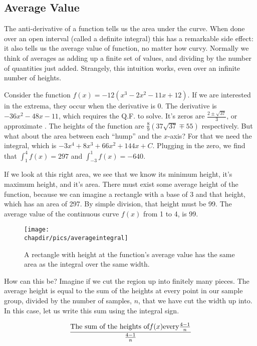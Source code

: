 \subsection{Average Value}
The anti-derivative of a function tells us the area under the curve.  When done over an open
interval (called a definite integral) this has a remarkable side effect: it also tells us the average
value of function, no matter how curvy.  Normally we think of averages as adding up a finite set 
of values, and dividing by the number of quantities just added.  Strangely, this intuition works,
even over an infinite number of heights.

Consider the function $f(x)=-12(x^3-2x^2-11x+12)$.  If we are interested in the extrema, they 
occur when the derivative is 0.  The derivative is $-36x^2-48x-11$, which requires the Q.F. to
solve.  It's zeros are $\frac{2\pm\sqrt{37}}{3}$, or approximate .  The heights of the function
are $\frac{8}{9}(37\sqrt{37}\mp55)$ respectively.  But what about the area between each 
``hump'' and the $x$-axis?  For that we need the integral, which is $-3x^4+8x^3+66x^2+144x+C$.
Plugging in the zero, we find that $\int_1^4 f(x) = 297$ and $\int_{-3}^1 f(x) = -640$.

If we look at this right area, we see that we know its minimum height, it's maximum height, and
it's area.  There must exist some average height of the function, because we can imagine a rectangle
with a base of 3 and that height, which has an area of 297.  By simple division, that height must be
99.  The average value of the continuous curve $f(x)$ from 1 to 4, is 99.


\begin{figure}[h]
\begin{centering}
\texttt{[image: \\chapdir/pics/averageintegral]}
\caption[Integrals and Averages]{A rectangle with height at the function's average value has the same area as the integral over the same width.}
\end{centering}
\end{figure}

How can this be?  Imagine if we cut the region up into finitely many pieces.  The average height
is equal to the sum of the heights at every point in our sample group, divided by the number of
samples, $n$, that we have cut the width up into.  
In this case, let us write this sum using the integral sign.

$$
\cfrac{\text{The sum of the heights of} f(x) \text{every} \frac{4-1}{n}}{\frac{4-1}{n}}
$$

